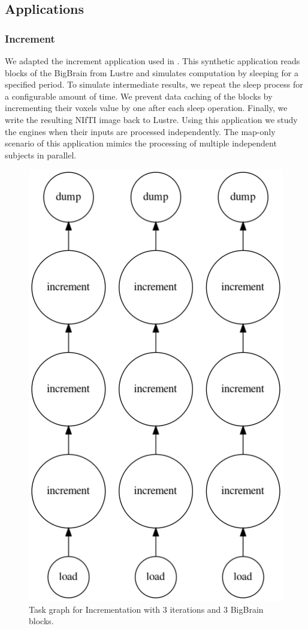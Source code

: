 \documentclass[conference]{IEEEtran}
\begin{document}
\subsection{Applications}
\subsubsection{Increment}
We adapted the increment application used in \cite{hayot2019performance}.
This synthetic application reads blocks of the BigBrain from Lustre and simulates computation by sleeping for a specified period.
To simulate intermediate results, we repeat the sleep process for a configurable amount of time.
We prevent data caching of the blocks by incrementing their voxels value by one after each sleep operation.
Finally, we write the resulting NIfTI image back to Lustre.
Using this application we study the engines when their inputs are processed independently.
The map-only scenario of this application mimics the processing of multiple independent subjects in parallel.


\begin{figure}[!ht]
	\centering
	\includegraphics[height=\columnwidth,
	angle=0]{figures/increment.png}
	\caption{Task graph for Incrementation with 3 iterations and 3 BigBrain blocks.}
	\label{fig:graph-increment}
\end{figure}
\end{document}
